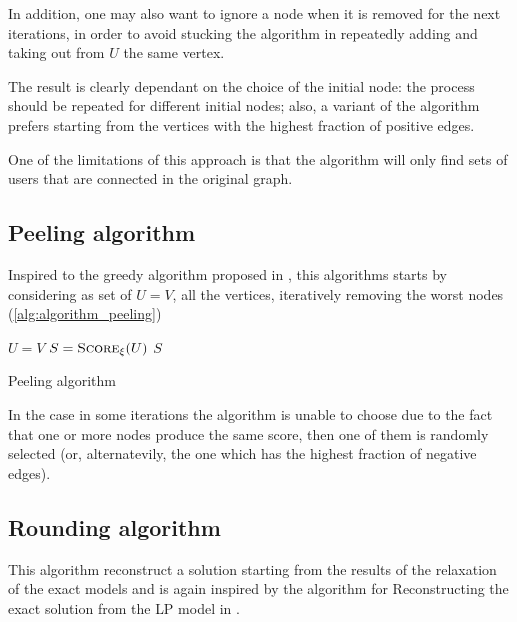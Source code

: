In addition, one may also want to ignore a node when it is removed for the
next iterations, in order to avoid stucking the algorithm in repeatedly adding
and taking out from $U$ the same vertex.

The result is clearly dependant on the choice of the initial node: the process
should be repeated for different initial nodes; also, a variant
of the algorithm prefers starting from the vertices with the highest fraction of positive edges.

One of the limitations of this approach is that the algorithm will only find
sets of users that are connected in the original graph.

\subsection{Peeling algorithm}%
\label{ssub:peeling_algorithm}

Inspired to the greedy algorithm proposed in \cite{charikar2000greedy}, this
algorithms starts by considering as set of $U = V$, all the vertices,
iteratively removing the worst nodes (\autoref{alg:algorithm_peeling})

\begin{algorithm}
	\SetAlgoLined
	$U = V$\;
	$S = \textsc{Score}_{\xi}(U)$ \;
	\Return $S$ \;

	\caption{Peeling algorithm}
	\label{alg:algorithm_peeling}
\end{algorithm}

In the case in some iterations the algorithm is unable to choose due to the
fact that one or more nodes produce the same score, then one of them is
randomly selected (or, alternatevily, the one which has the highest fraction of
negative edges).

\subsection{Rounding algorithm}%
\label{ssub:rounding_algorithm}

This algorithm reconstruct a solution starting from the results of the
relaxation of the exact models and is again inspired by the algorithm for
Reconstructing the exact solution from the \acrshort{LP} model in
\cite{charikar2000greedy}.

